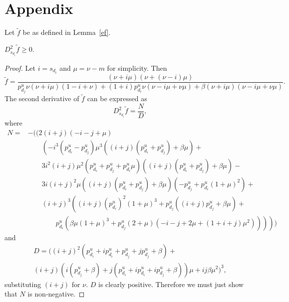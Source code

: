 \documentclass[prodmode,acmtissec]{acmsmall}
\begin{document}
\section{Appendix}
Let $\tilde{f}$ be as defined in Lemma~\ref{ef}.
\begin{lemma} \label{lem:d2f}
$D^2_{s_{d_i}} \tilde{f} \ge 0$.
\end{lemma}
\begin{proof}
Let $i=s_{d_i}$ and $\mu=\nu-m$ for simplicity.  Then
\begin{equation*}
\tilde{f} = \frac{(\nu +i \mu ) (\nu +(\nu -i) \mu )}{p^u_{d_j} \nu (\nu +i \mu ) (1-i+\nu )+(1+i) p^u_{d_i} \nu  (\nu -i \mu +\nu  \mu )+\beta  (\nu +i \mu ) (\nu -i \mu +\nu  \mu )}.
\end{equation*}
The second derivative of $\tilde{f}$ can be expressed as
\begin{equation*}
D^2_{s_{d_i}} \tilde{f} = \frac{N}{D},
\end{equation*}
where
\begin{align*}
N = &-\bigg( (2 (i+j) (-i-j+\mu ) \\
&\qquad \left(-i^3 (p^u_{d_i}-p^u_{d_j}) \mu ^3 ((i+j) (p^u_{d_i}+p^u_{d_j})+\beta  \mu )+ \right. \\
&\qquad 3 i^2 (i+j) \mu^2 (p^u_{d_i}+p^u_{d_j}+p^u_{d_i} \mu ) ((i+j) (p^u_{d_i}+p^u_{d_j})+\beta  \mu )-\\
&\qquad 3 i (i+j)^2 \mu  ((i+j) (p^u_{d_i}+p^u_{d_j})+\beta  \mu ) \left(-p^u_{d_j}+p^u_{d_i} (1+\mu )^2\right)+\\
&\qquad (i+j)^3 \left((i+j) (p^u_{d_i})^2 (1+\mu )^3+p^u_{d_j} ((i+j) p^u_{d_j}+\beta  \mu )+ \right. \\
&\qquad\qquad \left. \left. p^u_{d_i} \left(\beta  \mu  (1+\mu )^3+p^u_{d_j} (2+\mu ) \left(-i-j+2 \mu +(1+i+j) \mu^2\right)\right)\right)\right)\bigg)
\end{align*}
and
\begin{multline*}
D = \bigg((i+j)^2 (p^u_{d_i}+i p^u_{d_i}+p^u_{d_j}+j p^u_{d_j}+\beta )+\\
(i+j) (i (p^u_{d_j}+\beta )+j (p^u_{d_i}+i p^u_{d_i}+i p^u_{d_j}+\beta )) \mu +i j \beta  \mu^2\bigg)^3,
\end{multline*}
substituting $(i+j)$ for $\nu$.  $D$ is clearly positive.  Therefore we must just show that $N$ is non-negative.


\end{proof}
\end{document}
